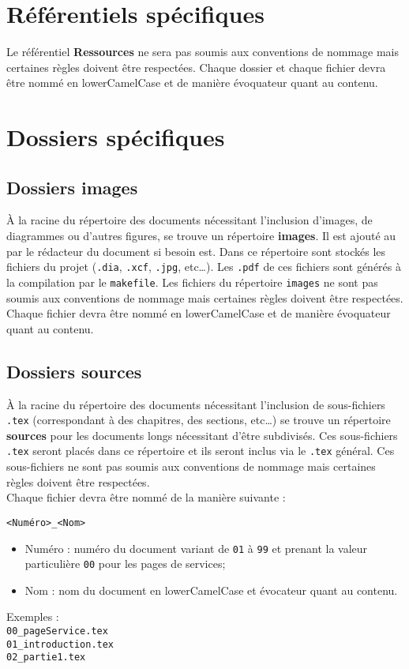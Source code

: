 \section{Référentiels spécifiques}

Le référentiel \textbf{Ressources} ne sera pas soumis aux conventions de nommage mais certaines règles doivent être respectées. Chaque dossier et chaque fichier devra être nommé en lowerCamelCase et de manière évoquateur quant au contenu. 

\section{Dossiers spécifiques}

\subsection{Dossiers images}

\`{A} la racine du répertoire des documents nécessitant l'inclusion d'images, de diagrammes ou
d'autres figures, se trouve un répertoire \textbf{images}. Il est ajouté au \git{} par le
rédacteur du document si besoin est. Dans ce répertoire sont stockés les fichiers du projet
(\verb+.dia+, \verb+.xcf+, \verb+.jpg+, etc\dots). Les \verb+.pdf+ de ces fichiers sont générés
à la compilation par le \verb+makefile+.
Les fichiers du répertoire \verb+images+ ne sont pas soumis aux conventions de nommage mais certaines règles doivent être respectées. Chaque fichier devra être nommé en lowerCamelCase et de manière évoquateur quant au contenu. 

\subsection{Dossiers sources}

\`{A} la racine du répertoire des documents nécessitant l'inclusion de sous-fichiers \verb+.tex+
(correspondant à des chapitres, des sections, etc\dots) se trouve un répertoire \textbf{sources} pour
les documents longs nécessitant d'être subdivisés. 
Ces sous-fichiers \verb+.tex+ seront placés dans ce répertoire et ils seront inclus via
le \verb+.tex+ général. Ces sous-fichiers ne sont pas soumis aux conventions de nommage mais certaines règles doivent être respectées.\\
Chaque fichier devra être nommé de la manière suivante :
\begin{center}
\verb+<Numéro>_<Nom>+
\end{center}
\begin{itemize} 
\item Numéro : numéro du document variant de \verb+01+ à \verb+99+ et prenant la valeur particulière \verb+00+ pour les pages de services;
\item Nom : nom du document en lowerCamelCase et évocateur quant au contenu.\\
\end{itemize}
Exemples : \\
\verb+00_pageService.tex+\\
\verb+01_introduction.tex+\\
\verb+02_partie1.tex+\\

